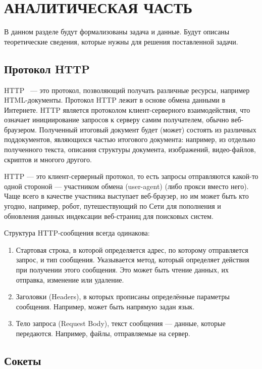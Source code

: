 \chapter{АНАЛИТИЧЕСКАЯ ЧАСТЬ}

В данном разделе будут формализованы задача и данные. Будут описаны теоретические сведения, которые нужны для решения поставленной задачи. 
\section{Протокол HTTP}\label{data}

HTTP~\cite{http}  --- это протокол, позволяющий получать различные ресурсы, например HTML-документы. Протокол HTTP лежит в основе обмена данными в Интернете. HTTP является протоколом клиент-серверного взаимодействия, что означает инициирование запросов к серверу самим получателем, обычно веб-браузером. Полученный итоговый документ будет (может) состоять из различных поддокументов, являющихся частью итогового документа: например, из отдельно полученного текста, описания структуры документа, изображений, видео-файлов, скриптов и многого другого.

HTTP --- это клиент-серверный протокол, то есть запросы отправляются какой-то одной стороной — участником обмена (user-agent) (либо прокси вместо него). Чаще всего в качестве участника выступает веб-браузер, но им может быть кто угодно, например, робот, путешествующий по Сети для пополнения и обновления данных индексации веб-страниц для поисковых систем.

Структура HTTP-сообщения всегда одинакова:

\begin{enumerate}
	\item Стартовая строка, в которой определяется адрес, по которому отправляется запрос, и тип сообщения. Указывается метод, который определяет действия при получении этого сообщения. Это может быть чтение данных, их отправка, изменение или удаление.
	\item Заголовки (Headers), в которых прописаны определённые параметры сообщения. Например, может быть напрямую задан язык.
	\item Тело запроса (Request Body), текст сообщения — данные, которые передаются. Например, файлы, отправляемые на сервер.
\end{enumerate}

\section{Сокеты}\label{functions}

